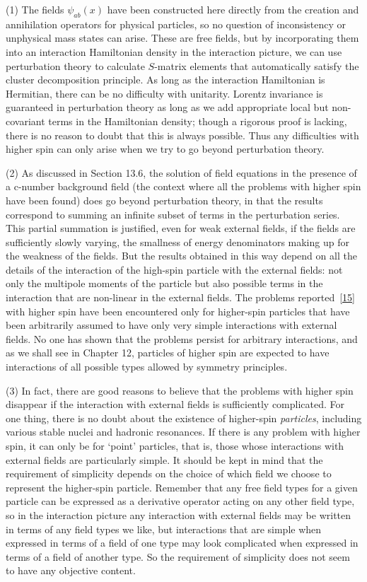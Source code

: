 (1) The fields $\psi_{ab}(x)$ have been constructed here directly from the
creation and annihilation operators for physical particles, so no question of
inconsistency or unphysical mass states can arise. These are free fields, but
by incorporating them into an interaction Hamiltonian density in the
interaction picture, we can use perturbation theory to calculate $S$-matrix
elements that automatically satisfy the cluster decomposition principle. As
long as the interaction Hamiltonian is Hermitian, there can be no difficulty
with unitarity. Lorentz invariance is guaranteed in perturbation theory as long
as we add appropriate local but non-covariant terms in the Hamiltonian
density; though a rigorous proof is lacking, there is no reason to doubt that
this is always possible. Thus any difficulties with higher spin can only arise
when we try to go beyond perturbation theory.

(2) As discussed in Section 13.6, the solution of field equations in the
presence of a c-number background field (the context where all the problems
with higher spin have been found) does go beyond perturbation theory, in that
the results correspond to summing an infinite subset of terms in the
perturbation series. This partial summation is justified, even for weak
external fields, if the fields are sufficiently slowly varying, the smallness
of energy denominators making up for the weakness of the fields. But the
results obtained in this way depend on all the details of the interaction of
the high-spin particle with the external fields: not only the multipole moments
of the particle but also possible terms in the interaction that are non-linear
in the external fields. The problems reported~\hyperref[ref:5.15]{[15]} with higher spin have been
encountered only for higher-spin particles that have been arbitrarily assumed
to have only very simple interactions with external fields. No one has shown
that the problems persist for arbitrary interactions, and as we shall see in
Chapter 12, particles of higher spin are expected to have interactions of all
possible types allowed by symmetry principles.

(3) In fact, there are good reasons to believe that the problems with higher
spin disappear if the interaction with external fields is sufficiently
complicated. For one thing, there is no doubt about the existence of
higher-spin \emph{particles}, including various stable nuclei and hadronic
resonances. If there is any problem with higher spin, it can only be for
`point' particles, that is, those whose interactions with external fields are
particularly simple. It should be kept in mind that the requirement of
simplicity depends on the choice of which field we choose to represent the
higher-spin particle. Remember that any free field types for a given particle
can be expressed as a derivative operator acting on any other field type, so in
the interaction picture any interaction with external fields may be written in
terms of any field types we like, but interactions that are simple when
expressed in terms of a field of one type may look complicated when expressed
in terms of a field of another type. So the requirement of simplicity does not
seem to have any objective content.

